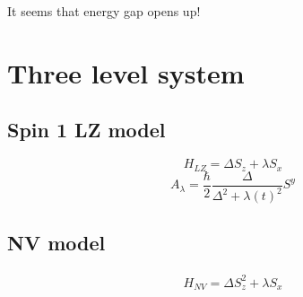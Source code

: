 \documentclass[11pt,a4paper]{article}
\begin{document}
It seems that energy gap opens up!

\section{Three level system}
\subsection{Spin 1 LZ model}

\begin{equation}
H_{LZ}= \Delta S_z + \lambda S_x
\end{equation}
\begin{equation}
A_{\lambda}= \dfrac{\hbar}{2}\dfrac{\Delta }{\Delta^2 + \lambda(t)^2} S^y
\end{equation}
\subsection{NV model}
\begin{align*}
H_{NV} = \Delta S_z^2 + \lambda   S_x  
\end{align*}
 


%
\end{document}
